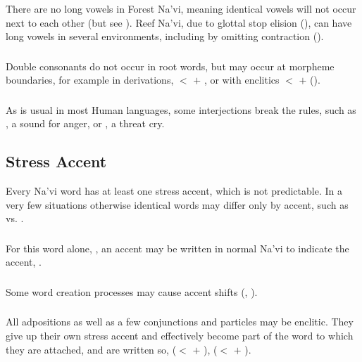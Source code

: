 \subsubsection{} There are no long vowels in Forest Na'vi, meaning
identical vowels will not occur next to each other (but see
).  Reef Na'vi, due to glottal stop
elision (), can have long vowels in several
environments, including by omitting contraction
(). 

\subsubsection{} Double consonants do not occur in root words, but
may occur at morpheme boundaries, for example in derivations,
 $<$  $+$ , or with enclitics
 $<$  $+$  ().

\subsubsection{} As is usual in most Human languages, some
interjections break the rules, such as , a sound for anger, or
, a threat cry.


\subsection{Stress Accent}
Every Na'vi word has at least one stress accent, which is not
predictable.  In a very few situations otherwise identical words may
differ only by accent, such as  
vs.  .

\subsubsection{} For this word alone, , an accent may be
written in normal Na'vi to indicate the accent, .

\subsubsection{} Some word creation processes may cause accent shifts
(, ).

\subsubsection{} All adpositions as well as a few conjunctions and
particles may be enclitic.  They give up their own stress accent and
effectively become part of the word to which they are attached, and
are written so,  ($<$  $+$ ),
 ($<$  $+$ ).
\label{l-and-s:stress:enclisis}

